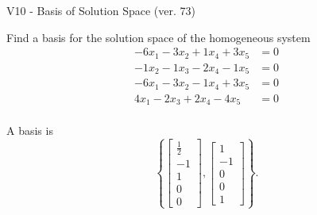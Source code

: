 \begin{exercise}
  \begin{exerciseTitle}V10 - Basis of Solution Space (ver. 73)\end{exerciseTitle}
  \begin{exerciseStatement}
    Find a basis for the solution space of the homogeneous system 
\begin{align*}
 -6 x_ 1 -3 x_ 2 + 1 x_ 4 + 3 x_ 5 &= 0  \\ 
  -1 x_ 2 -1 x_ 3 -2 x_ 4 -1 x_ 5 &= 0  \\ 
  -6 x_ 1 -3 x_ 2 -1 x_ 4 + 3 x_ 5 &= 0  \\ 
  4 x_ 1 -2 x_ 3 + 2 x_ 4 -4 x_ 5 &= 0  \\ 
 \end{align*}


 
  \end{exerciseStatement}

  \begin{exerciseAnswer}
   A basis is   
\[\left\{\left[\begin{array}{c}
\frac{1}{2} \\
-1 \\
1 \\
0 \\
0
\end{array}\right] , \left[\begin{array}{c}
1 \\
-1 \\
0 \\
0 \\
1
\end{array}\right]\right\}.\]

  


  \end{exerciseAnswer}
\end{exercise}